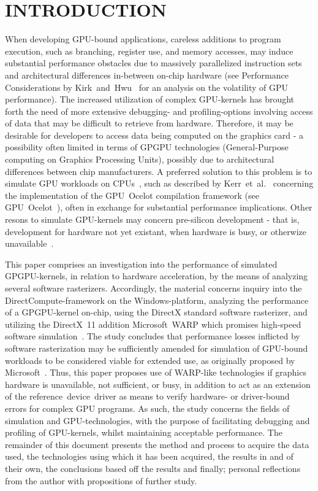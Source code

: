 
\section{INTRODUCTION}
\label{sec:introduction}
When developing GPU-bound applications, careless additions to  program execution, such as branching, register use, and memory accesses, may induce substantial performance obstacles due to massively parallelized instruction sets and architectural differences in-between on-chip hardware (see Performance Considerations by Kirk~and~Hwu~\cite[ch.~6]{Kirk:2010:PMP:1841511} for an analysis on the volatility of GPU performance).
The increased utilization of complex GPU-kernels has brought forth the need of more extensive debugging- and profiling-options involving access of data that may be difficult to retrieve from hardware.
Therefore, it may be desirable for developers to access data being computed on the graphics card - a possibility often limited in terms of GPGPU technologies (General-Purpose computing on Graphics Processing Units), possibly due to architectural differences between chip manufacturers.
A preferred solution to this problem is to simulate GPU workloads on CPUs~, such as described by Kerr~et~al.~\cite[p.~416-419]{Hwu:2011:GCG:2103614} concerning the implementation of the GPU~Ocelot compilation framework (see GPU~Ocelot~), often in exchange for substantial performance implications.
Other resons to simulate GPU-kernels may concern pre-silicon development - that is, development for hardware not yet existant, when hardware is busy, or otherwize unavailable~.

This paper comprises an investigation into the performance of simulated GPGPU-kernels, in relation to hardware acceleration, by the means of analyzing several software rasterizers.
Accordingly, the material concerns inquiry into the DirectCompute-framework on the Windows-platform, analyzing the performance of a GPGPU-kernel on-chip, using the DirectX standard software rasterizer, and utilizing the DirectX~11 addition Microsoft~WARP which promises high-speed software simulation~.
The study concludes that performance losses inflicted by software rasterization may be sufficiently amended for simulation of GPU-bound workloads to be considered viable for extended use, as originally proposed by Microsoft~.
Thus, this paper proposes use of WARP-like technologies if graphics hardware is unavailable, not sufficient, or busy, in addition to act as an extension of the reference~device~driver as means to verify hardware- or driver-bound errors for complex GPU programs.
As such, the study concerns the fields of simulation and GPU-technologies, with the purpose of facilitating debugging and profiling of GPU-kernels, whilst maintaining acceptable performance.
The remainder of this document presents the method and process to acquire the data used, the technologies using which it has been acquired, the results in and of their own, the conclusions based off the results and finally; personal reflections from the author with propositions of further study.
